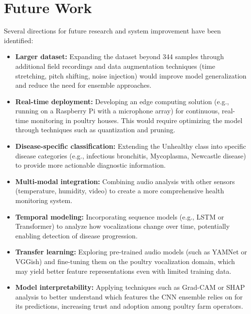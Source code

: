 \documentclass[12pt,a4paper]{report}
\begin{document}
\section{Future Work}

Several directions for future research and system improvement have been identified:

\begin{itemize}
    \item \textbf{Larger dataset:} Expanding the dataset beyond 344 samples through additional field recordings and data augmentation techniques (time stretching, pitch shifting, noise injection) would improve model generalization and reduce the need for ensemble approaches.

    \item \textbf{Real-time deployment:} Developing an edge computing solution (e.g., running on a Raspberry Pi with a microphone array) for continuous, real-time monitoring in poultry houses. This would require optimizing the model through techniques such as quantization and pruning.

    \item \textbf{Disease-specific classification:} Extending the Unhealthy class into specific disease categories (e.g., infectious bronchitis, Mycoplasma, Newcastle disease) to provide more actionable diagnostic information.

    \item \textbf{Multi-modal integration:} Combining audio analysis with other sensors (temperature, humidity, video) to create a more comprehensive health monitoring system.

    \item \textbf{Temporal modeling:} Incorporating sequence models (e.g., LSTM or Transformer) to analyze how vocalizations change over time, potentially enabling detection of disease progression.

    \item \textbf{Transfer learning:} Exploring pre-trained audio models (such as YAMNet or VGGish) and fine-tuning them on the poultry vocalization domain, which may yield better feature representations even with limited training data.

    \item \textbf{Model interpretability:} Applying techniques such as Grad-CAM or SHAP analysis to better understand which features the CNN ensemble relies on for its predictions, increasing trust and adoption among poultry farm operators.
\end{itemize}
\end{document}

